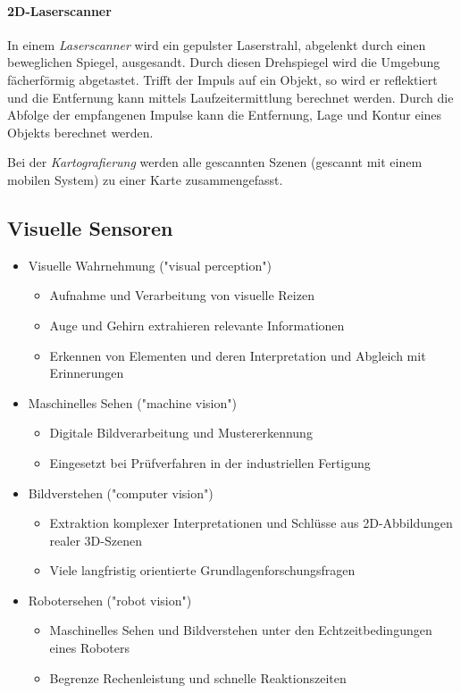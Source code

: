 		\paragraph{2D-Laserscanner}
			In einem \emph{Laserscanner} wird ein gepulster Laserstrahl, abgelenkt durch einen beweglichen Spiegel, ausgesandt. Durch diesen Drehspiegel wird die Umgebung fächerförmig abgetastet. Trifft der Impuls auf ein Objekt, so wird er reflektiert und die Entfernung kann mittels Laufzeitermittlung berechnet werden. Durch die Abfolge der empfangenen Impulse kann die Entfernung, Lage und Kontur eines Objekts berechnet werden.

			Bei der \emph{Kartografierung} werden alle gescannten Szenen (gescannt mit einem mobilen System) zu einer Karte zusammengefasst.

\subsection{Visuelle Sensoren}
	\begin{itemize}
		\item Visuelle Wahrnehmung ("visual perception")
			\begin{itemize}
				\item Aufnahme und Verarbeitung von visuelle Reizen
				\item Auge und Gehirn extrahieren relevante Informationen
				\item Erkennen von Elementen und deren Interpretation und Abgleich mit Erinnerungen
			\end{itemize}
		\item Maschinelles Sehen ("machine vision")
			\begin{itemize}
				\item Digitale Bildverarbeitung und Mustererkennung
				\item Eingesetzt \zB bei Prüfverfahren in der industriellen Fertigung
			\end{itemize}
		\item Bildverstehen ("computer vision")
			\begin{itemize}
				\item Extraktion komplexer Interpretationen und Schlüsse aus 2D-Abbildungen realer 3D-Szenen
				\item Viele langfristig orientierte Grundlagenforschungsfragen
			\end{itemize}
		\item Robotersehen ("robot vision")
			\begin{itemize}
				\item Maschinelles Sehen und Bildverstehen unter den Echtzeitbedingungen eines Roboters
				\item Begrenze Rechenleistung und schnelle Reaktionszeiten
			\end{itemize}
	\end{itemize}

